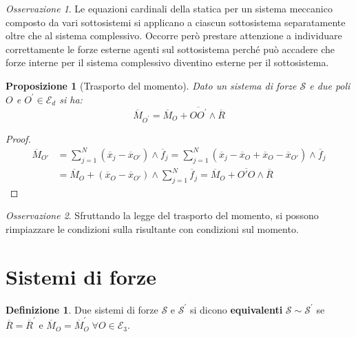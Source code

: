 \documentclass{book}
\theoremstyle{plain}
\theoremstyle{plain}
\theoremstyle{plain}
\theoremstyle{plain}
\theoremstyle{plain}
\newtheorem{prop}{Proposizione}[chapter]
\theoremstyle{definition}
\newtheorem{defi}{Definizione}[chapter]
\theoremstyle{remark}
\newtheorem*{oss}{Osservazione}
\theoremstyle{definition}
\begin{document}
\begin{oss}
    Le equazioni cardinali della statica per un sistema meccanico composto da vari sottosistemi si applicano a ciascun sottosistema separatamente oltre che al sistema complessivo. Occorre però prestare attenzione a individuare correttamente le forze esterne agenti sul sottosistema perché può accadere che forze interne per il sistema complessivo diventino esterne per il sottosistema.
\end{oss}

\begin{prop}[Trasporto del momento]
    Dato un sistema di forze $\mathcal{S}$ e due poli $O$ e $O^{\prime} \in \mathcal{E}_{d}$ si ha: \begin{displaymath}
    \boxed{
    \overline{M}_{O^{\prime}}=\overline{M}_{O}+\overline{OO^{\prime}} \wedge \overline{R}
    }
    \end{displaymath}
\end{prop}

\begin{proof}
    \[
    \begin{split}
        \overline{M}_{O'}&=\sum_{j=1}^N(\overline{x}_j-\overline{x}_{O'})\wedge\overline{f}_j=\sum_{j=1}^N(\overline{x}_j-\overline{x}_O+\overline{x}_O-\overline{x}_{O'})\wedge\overline{f}_j \\
        &=\overline{M}_O+(\overline{x}_O-\overline{x}_{O'})\wedge\sum_{j=1}^N\overline{f}_j=\overline{M}_O+\overline{O'O}\wedge\overline{R}
    \end{split}
    \]
\end{proof}

\begin{oss}
    Sfruttando la legge del trasporto del momento, si possono rimpiazzare le condizioni sulla risultante con condizioni sul momento.
\end{oss}

\section{Sistemi di forze}

\begin{defi}
    Due sistemi di forze $\mathcal{S}$ e $\mathcal{S}^{\prime}$ si dicono \textbf{equivalenti} $\mathcal{S} \sim \mathcal{S}^{\prime}$ se $\overline{R}=\overline{R}^{\prime}$ e $\overline{M}_{O}=\overline{M}_{O}^{\prime}\; \forall O \in \mathcal{E}_{3}$. 
\end{defi}
\end{document}
